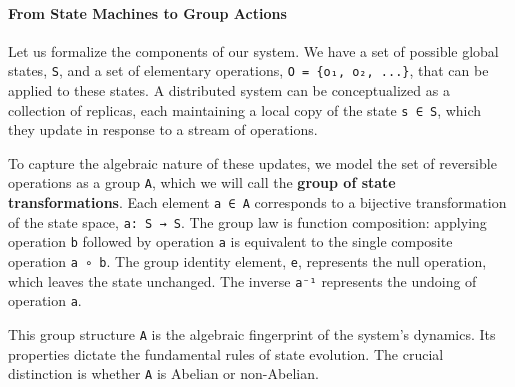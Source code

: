 \documentclass[
]{article}
\begin{document}
\paragraph{From State Machines to Group
Actions}\label{from-state-machines-to-group-actions}

Let us formalize the components of our system. We have a set of possible
global states, \texttt{S}, and a set of elementary operations,
\texttt{O\ =\ \{o₁,\ o₂,\ ...\}}, that can be applied to these states. A
distributed system can be conceptualized as a collection of replicas,
each maintaining a local copy of the state \texttt{s\ ∈\ S}, which they
update in response to a stream of operations.

To capture the algebraic nature of these updates, we model the set of
reversible operations as a group \texttt{A}, which we will call the
\textbf{group of state transformations}. Each element \texttt{a\ ∈\ A}
corresponds to a bijective transformation of the state space,
\texttt{a:\ S\ →\ S}. The group law is function composition: applying
operation \texttt{b} followed by operation \texttt{a} is equivalent to
the single composite operation \texttt{a\ ∘\ b}. The group identity
element, \texttt{e}, represents the null operation, which leaves the
state unchanged. The inverse \texttt{a⁻¹} represents the undoing of
operation \texttt{a}.

This group structure \texttt{A} is the algebraic fingerprint of the
system's dynamics. Its properties dictate the fundamental rules of state
evolution. The crucial distinction is whether \texttt{A} is Abelian or
non-Abelian.
\end{document}

